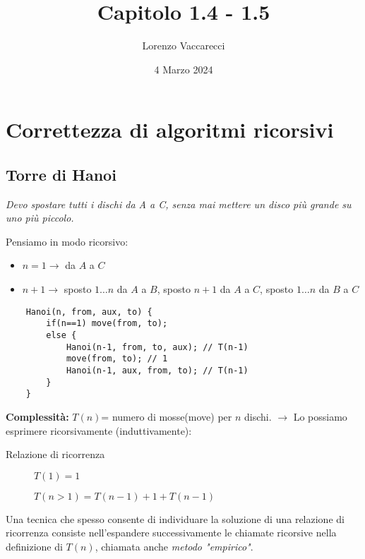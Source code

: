 \documentclass[12pt]{article}
\title{Capitolo 1.4 - 1.5}
\author{Lorenzo Vaccarecci}
\date{4 Marzo 2024}
\begin{document}
\maketitle
\section{Correttezza di algoritmi ricorsivi}
\subsection{Torre di Hanoi}
\textit{Devo spostare tutti i dischi da A a C, senza mai mettere un disco più grande su uno più piccolo.}
\begin{center}
\end{center}
Pensiamo in modo ricorsivo:
\begin{itemize}
    \item $n=1 \rightarrow$ da $A$ a $C$
    \item $n+1 \rightarrow$ sposto $1\dots n$ da $A$ a $B$, sposto $n+1$ da $A$ a $C$, sposto $1\dots n$ da $B$ a $C$
\end{itemize}
\begin{verbatim}
    Hanoi(n, from, aux, to) {
        if(n==1) move(from, to);
        else {
            Hanoi(n-1, from, to, aux); // T(n-1)
            move(from, to); // 1
            Hanoi(n-1, aux, from, to); // T(n-1)
        }
    }
\end{verbatim}
\textbf{Complessità:} $T(n)$= numero di mosse(move) per $n$ dischi. $\rightarrow$ Lo possiamo esprimere ricorsivamente (induttivamente):
\begin{description}
    \item[Relazione di ricorrenza]
    \item[]  $T(1)=1$
    \item[] $T(n>1)=T(n-1)+1+T(n-1)$
\end{description}
Una tecnica che spesso consente di individuare la soluzione di una relazione di ricorrenza consiste nell'espandere successivamente le chiamate ricorsive nella definizione di $T(n)$, chiamata anche \textit{metodo "empirico"}.\newpage
\end{document}
